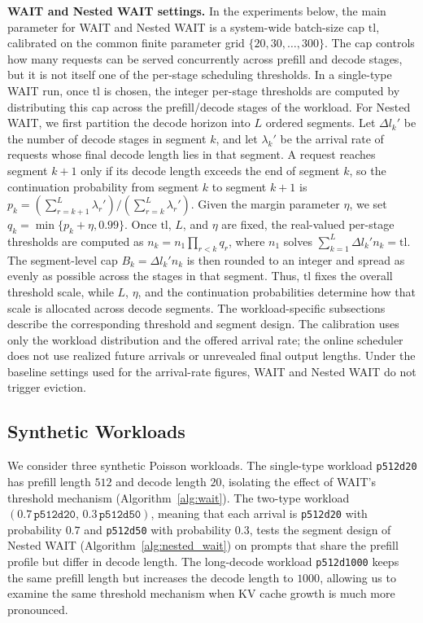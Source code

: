 \textbf{WAIT and Nested WAIT settings.} In the experiments below, the main parameter for WAIT and Nested WAIT is a system-wide batch-size cap $\mathrm{tl}$, calibrated on the common finite parameter grid \(\{20,30,\ldots,300\}\). The cap controls how many requests can be served concurrently across prefill and decode stages, but it is not itself one of the per-stage scheduling thresholds. In a single-type WAIT run, once $\mathrm{tl}$ is chosen, the integer per-stage thresholds are computed by distributing this cap across the prefill/decode stages of the workload. For Nested WAIT, we first partition the decode horizon into \(L\) ordered segments. Let \(\Delta l_k'\) be the number of decode stages in segment \(k\), and let \(\lambda_k'\) be the arrival rate of requests whose final decode length lies in that segment. A request reaches segment \(k{+}1\) only if its decode length exceeds the end of segment \(k\), so the continuation probability from segment \(k\) to segment \(k{+}1\) is \(p_k=(\sum_{r=k+1}^L\lambda_r')/(\sum_{r=k}^L\lambda_r')\). Given the margin parameter \(\eta\), we set \(q_k=\min\{p_k+\eta,0.99\}\). Once \(\mathrm{tl}\), \(L\), and \(\eta\) are fixed, the real-valued per-stage thresholds are computed as \(n_k=n_1\prod_{r<k}q_r\), where \(n_1\) solves \(\sum_{k=1}^L \Delta l_k' n_k=\mathrm{tl}\). The segment-level cap \(B_k=\Delta l_k'n_k\) is then rounded to an integer and spread as evenly as possible across the stages in that segment. Thus, \(\mathrm{tl}\) fixes the overall threshold scale, while \(L\), \(\eta\), and the continuation probabilities determine how that scale is allocated across decode segments. The workload-specific subsections describe the corresponding threshold and segment design. The calibration uses only the workload distribution and the offered arrival rate; the online scheduler does not use realized future arrivals or unrevealed final output lengths. Under the baseline settings used for the arrival-rate figures, WAIT and Nested WAIT do not trigger eviction.


\subsection{Synthetic Workloads}
\label{sec:exp_synthetic}

We consider three synthetic Poisson workloads. The single-type workload \texttt{p512d20} has prefill length $512$ and decode length $20$, isolating the effect of WAIT's threshold mechanism (Algorithm~\ref{alg:wait}). The two-type workload $(0.7\,\texttt{p512d20},\,0.3\,\texttt{p512d50})$, meaning that each arrival is \texttt{p512d20} with probability $0.7$ and \texttt{p512d50} with probability $0.3$, tests the segment design of Nested WAIT (Algorithm~\ref{alg:nested_wait}) on prompts that share the prefill profile but differ in decode length. The long-decode workload \texttt{p512d1000} keeps the same prefill length but increases the decode length to $1000$, allowing us to examine the same threshold mechanism when KV cache growth is much more pronounced.

